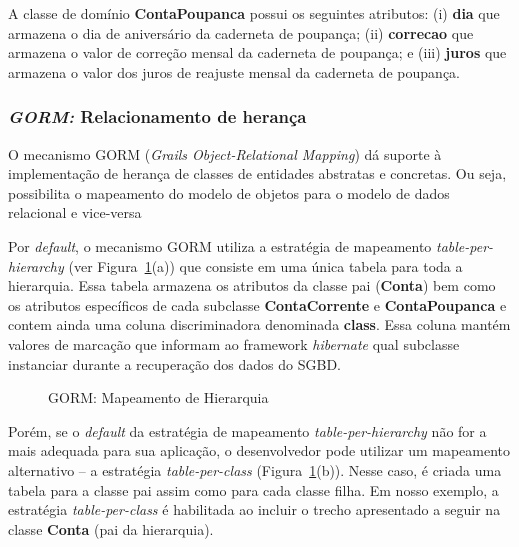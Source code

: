 A classe de domínio {\bf  ContaPoupanca} possui os seguintes atributos: (i) {\bf
  dia} que  armazena o dia  de aniversário da  caderneta de poupança;  (ii) {\bf
  correcao} que armazena o valor de  correção mensal da caderneta de poupança; e
(iii) {\bf juros} que armazena o valor dos juros de reajuste mensal da caderneta
de poupança.

\newpage

\subsubsection{{\it GORM:} Relacionamento de herança}
\label{secGORM}

\vspace{0.5cm}

O  mecanismo  GORM  ({\it   Grails  Object-Relational  Mapping})  dá  suporte  à
implementação de herança de classes de entidades abstratas e concretas. Ou seja,
possibilita o mapeamento do modelo de  objetos para o modelo de dados relacional
e vice-versa

Por  {\it default}, o  mecanismo GORM  utiliza a  estratégia de  mapeamento {\it
  table-per-hierarchy} (ver  Figura~\ref{gormFig}(a)) que consiste  em uma única
tabela para toda a hierarquia.  Essa  tabela armazena os atributos da classe pai
({\bf  Conta})  bem  como  os  atributos  específicos  de  cada  subclasse  {\bf
  ContaCorrente} e {\bf ContaPoupanca}  e contem ainda uma coluna discriminadora
denominada {\bf class}.  Essa coluna  mantém valores de marcação que informam ao
framework {\it  hibernate} qual subclasse  instanciar durante a  recuperação dos
dados do SGBD.

\begin{figure}[h]
\center
{}
\qquad
{}
\caption{GORM: Mapeamento de Hierarquia}
\label{gormFig}
\end{figure}

Porém, se o {\it default}  da estratégia de mapeamento {\it table-per-hierarchy}
não for  a mais adequada  para sua aplicação,  o desenvolvedor pode  utilizar um
mapeamento    alternativo     --    a    estratégia     {\it    table-per-class}
(Figura~\ref{gormFig}(b)). Nesse  caso, é  criada uma tabela  para a  classe pai
assim  como  para  cada  classe  filha.  Em nosso  exemplo,  a  estratégia  {\it
  table-per-class}  é habilitada  ao incluir  o trecho  apresentado a  seguir na
classe {\bf Conta} (pai da hierarquia).

